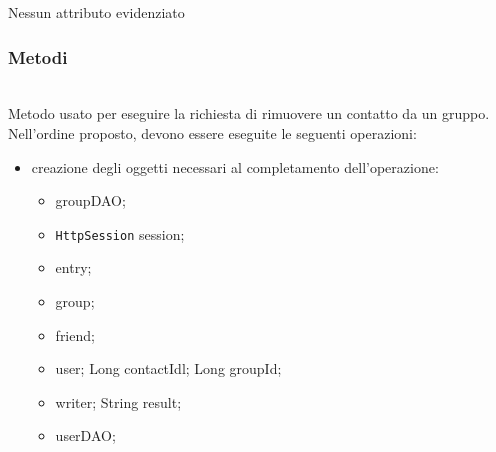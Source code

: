 Nessun attributo evidenziato


\subsubsection*{Metodi}

\begin{description}
	\item{}\\	
	Metodo usato per eseguire la richiesta di rimuovere un contatto da un gruppo. Nell'ordine proposto, devono essere eseguite le seguenti operazioni:
	\begin{itemize}
		\item creazione degli oggetti necessari al completamento dell'operazione:
		\begin{itemize}
			\item {} groupDAO;
			\item \texttt{HttpSession} session;
			\item {} entry;
			\item {} group;
			\item {} friend;
			\item {} user;
			Long contactIdl;
			Long groupId;
			\item {} writer;
			String result;
			\item {} userDAO;
		\end{itemize}
		

\end{itemize}
\end{description}
